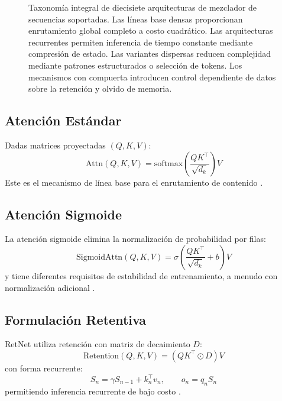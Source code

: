 \documentclass[11pt,a4paper]{article}
\begin{document}
\begin{figure}[t]
{}
\caption{Taxonomía integral de diecisiete arquitecturas de mezclador de secuencias soportadas. Las líneas base densas proporcionan enrutamiento global completo a costo cuadrático. Las arquitecturas recurrentes permiten inferencia de tiempo constante mediante compresión de estado. Las variantes dispersas reducen complejidad mediante patrones estructurados o selección de tokens. Los mecanismos con compuerta introducen control dependiente de datos sobre la retención y olvido de memoria.}
\label{fig:comprehensive-taxonomy}
\end{figure}

\subsection{Atención Estándar}
Dadas matrices proyectadas $(Q,K,V)$:
\[
\text{Attn}(Q,K,V)=\text{softmax}\left(\frac{QK^\top}{\sqrt{d_k}}\right)V
\]
Este es el mecanismo de línea base para el enrutamiento de contenido \citep{vaswani_attention_2017}.

\subsection{Atención Sigmoide}
La atención sigmoide elimina la normalización de probabilidad por filas:
\[
\text{SigmoidAttn}(Q,K,V)=\sigma\left(\frac{QK^\top}{\sqrt{d_k}}+b\right)V
\]
y tiene diferentes requisitos de estabilidad de entrenamiento, a menudo con normalización adicional \citep{ramapuram_theory_2024}.

\subsection{Formulación Retentiva}
RetNet utiliza retención con matriz de decaimiento $D$:
\[
\text{Retention}(Q,K,V)=\left(QK^\top \odot D\right)V
\]
con forma recurrente:
\[
S_n=\gamma S_{n-1}+k_n^\top v_n,\qquad o_n=q_n S_n
\]
permitiendo inferencia recurrente de bajo costo \citep{sun_retentive_2023,yang_survey_2025}.
\end{document}
